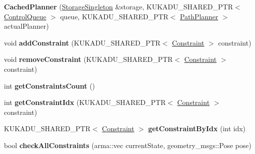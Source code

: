 \begin{DoxyCompactItemize}
\item 
{\bfseries Cached\+Planner} (\hyperlink{classkukadu_1_1StorageSingleton}{Storage\+Singleton} \&storage, K\+U\+K\+A\+D\+U\+\_\+\+S\+H\+A\+R\+E\+D\+\_\+\+P\+TR$<$ \hyperlink{classkukadu_1_1ControlQueue}{Control\+Queue} $>$ queue, K\+U\+K\+A\+D\+U\+\_\+\+S\+H\+A\+R\+E\+D\+\_\+\+P\+TR$<$ \hyperlink{classkukadu_1_1PathPlanner}{Path\+Planner} $>$ actual\+Planner)\hypertarget{classkukadu_1_1CachedPlanner_a8bb67cd5a15eb7ee0d6c1b2b3c021d62}{}\label{classkukadu_1_1CachedPlanner_a8bb67cd5a15eb7ee0d6c1b2b3c021d62}

\item 
void {\bfseries add\+Constraint} (K\+U\+K\+A\+D\+U\+\_\+\+S\+H\+A\+R\+E\+D\+\_\+\+P\+TR$<$ \hyperlink{classkukadu_1_1Constraint}{Constraint} $>$ constraint)\hypertarget{classkukadu_1_1CachedPlanner_a1d120556fae581cd672b092e55c76745}{}\label{classkukadu_1_1CachedPlanner_a1d120556fae581cd672b092e55c76745}

\item 
void {\bfseries remove\+Constraint} (K\+U\+K\+A\+D\+U\+\_\+\+S\+H\+A\+R\+E\+D\+\_\+\+P\+TR$<$ \hyperlink{classkukadu_1_1Constraint}{Constraint} $>$ constraint)\hypertarget{classkukadu_1_1CachedPlanner_a0eb037de2ecb5faddd9987a343b9eb40}{}\label{classkukadu_1_1CachedPlanner_a0eb037de2ecb5faddd9987a343b9eb40}

\item 
int {\bfseries get\+Constraints\+Count} ()\hypertarget{classkukadu_1_1CachedPlanner_ac2572fc2dc768b4293a007ffcf08d172}{}\label{classkukadu_1_1CachedPlanner_ac2572fc2dc768b4293a007ffcf08d172}

\item 
int {\bfseries get\+Constraint\+Idx} (K\+U\+K\+A\+D\+U\+\_\+\+S\+H\+A\+R\+E\+D\+\_\+\+P\+TR$<$ \hyperlink{classkukadu_1_1Constraint}{Constraint} $>$ constraint)\hypertarget{classkukadu_1_1CachedPlanner_af40f75c4480325970354b9865ff1b9f4}{}\label{classkukadu_1_1CachedPlanner_af40f75c4480325970354b9865ff1b9f4}

\item 
K\+U\+K\+A\+D\+U\+\_\+\+S\+H\+A\+R\+E\+D\+\_\+\+P\+TR$<$ \hyperlink{classkukadu_1_1Constraint}{Constraint} $>$ {\bfseries get\+Constraint\+By\+Idx} (int idx)\hypertarget{classkukadu_1_1CachedPlanner_a82fe109361ba1af2d459fda685899596}{}\label{classkukadu_1_1CachedPlanner_a82fe109361ba1af2d459fda685899596}

\item 
bool {\bfseries check\+All\+Constraints} (arma\+::vec current\+State, geometry\+\_\+msgs\+::\+Pose pose)\hypertarget{classkukadu_1_1CachedPlanner_a16dabf47c87ffe77ede8301dfec312db}{}\label{classkukadu_1_1CachedPlanner_a16dabf47c87ffe77ede8301dfec312db}


\end{DoxyCompactItemize}
